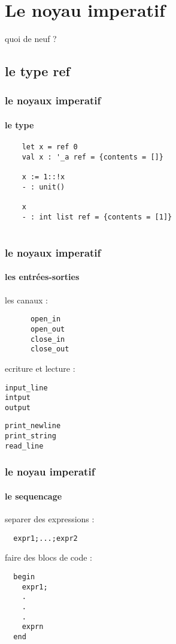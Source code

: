 \section{Le noyau imperatif}

\begin{frame}
quoi de neuf ? 
\end{frame}
\subsection{le type ref}
\begin{frame}[fragile]
  \frametitle{le noyaux imperatif}
  \framesubtitle{le type}
  \begin{lstlisting}
    let x = ref 0 
    val x : '_a ref = {contents = []}
   
    x := 1::!x
    - : unit()
     
    x
    - : int list ref = {contents = [1]}
     
  \end{lstlisting}
\end{frame} 
\begin{frame}[fragile]
  \frametitle{le noyaux imperatif}
  \framesubtitle{les entrées-sorties}
    les canaux : 
  \begin{lstlisting}
      open_in
      open_out
      close_in
      close_out
  \end{lstlisting}
    ecriture et lecture :
    \begin{minipage}[t]{4cm}
  \begin{lstlisting}
input_line
intput
output
  \end{lstlisting}
\end{minipage}
  \begin{minipage}[t]{4cm}
    \begin{lstlisting}
print_newline
print_string
read_line
      \end{lstlisting}
    \end{minipage}
\end{frame}

\begin{frame}[fragile]
  \frametitle{le noyau imperatif}
  \framesubtitle{le sequencage}
  separer des expressions :
  \begin{lstlisting}
  expr1;...;expr2
  \end{lstlisting}
  faire des blocs de code :
  \begin{lstlisting}
  begin
    expr1; 
    .
    .
    .
    exprn
  end
  \end{lstlisting}
\end{frame}

